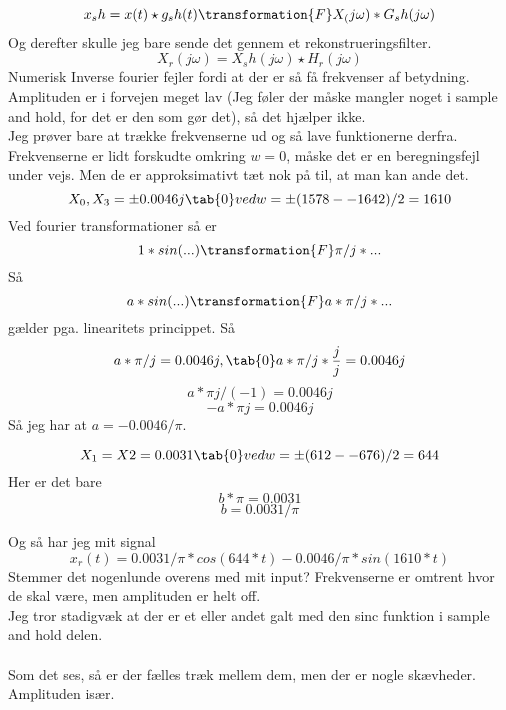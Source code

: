 \begin{Opgaver}
\begin{kapitel}
\begin{Opgave}
\begin{UnderOpgave}
                \[x_sh = x(t)\star g_sh(t) \transformation{F} X_(j\omega)*G_sh(j\omega)\]
                Og derefter skulle jeg bare sende det gennem et rekonstrueringsfilter.
                \[X_r(j\omega) = X_sh(j\omega)\star H_r(j\omega)\]
                Numerisk Inverse fourier fejler fordi at der er så få frekvenser af betydning. \\
                Amplituden er i forvejen meget lav (Jeg føler der måske mangler noget i sample and hold, for det er den som gør det), så det hjælper ikke.\\
                Jeg prøver bare at trække frekvenserne ud og så lave funktionerne derfra. 
                Frekvenserne er lidt forskudte omkring $w = 0$, måske det er en beregningsfejl under vejs. Men de er approksimativt tæt nok på til, at man kan ande det.
                \[X_0, X_3 = \pm 0.0046j \tab{0} ved w = \pm (1578 - -1642)/2 = 1610\]
                Ved fourier transformationer så er 
                \[1 * sin(...) \transformation{F} \pi/j * ... \]
                Så
                \[a * sin(...) \transformation{F} a * \pi/j * ... \]
                gælder pga. linearitets princippet. Så
                \[a * \pi /j = 0.0046j, \tab{0} a * \pi /j * \frac{j}{j} = 0.0046j\]
                \[a * \pi j /(-1) = 0.0046j\]
                \[-a * \pi j = 0.0046j\]
                Så jeg har at $a = -0.0046/\pi$. 

                \[X_1 = X2 = 0.0031 \tab{0} ved w = \pm (612 - -676)/2 = 644\]
                Her er det bare 
                \[b * \pi = 0.0031\]
                \[b = 0.0031/\pi\]

                Og så har jeg mit signal 
                \[x_r(t) = 0.0031/\pi * cos(644*t) - 0.0046/\pi * sin(1610*t)\]
                Stemmer det nogenlunde overens med mit input? Frekvenserne er omtrent hvor de skal være, men amplituden er helt off. \\
                Jeg tror stadigvæk at der er et eller andet galt med den sinc funktion i sample and hold delen. 
                \\\\
                Som det ses, så er der fælles træk mellem dem, men der er nogle skævheder. Amplituden især. 
            \end{UnderOpgave}
        \end{Opgave}
    \end{kapitel}
    
\end{Opgaver}